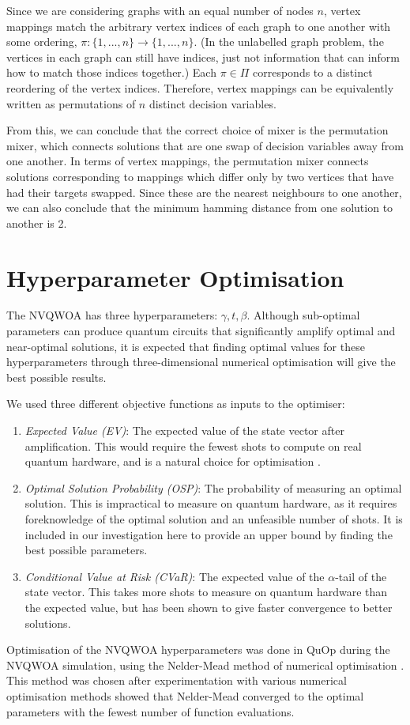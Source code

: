 Since we are considering graphs with an equal number of nodes $n$, vertex mappings match the arbitrary vertex indices of each graph to one another with some ordering, $\pi:\{1,...,n\}\to\{1,...,n\}$. (In the unlabelled graph problem, the vertices in each graph can still have indices, just not information that can inform how to match those indices together.) Each $\pi\in\Pi$ corresponds to a distinct reordering of the vertex indices. Therefore, vertex mappings can be equivalently written as permutations of $n$ distinct decision variables.

From this, we can conclude that the correct choice of mixer is the permutation mixer, which connects solutions that are one swap of decision variables away from one another. In terms of vertex mappings, the permutation mixer connects solutions corresponding to mappings which differ only by two vertices that have had their targets swapped. Since these are the nearest neighbours to one another, we can also conclude that the minimum hamming distance from one solution to another is 2.

\section{Hyperparameter Optimisation} \label{sec:parameters}
The NVQWOA has three hyperparameters: $\gamma, t, \beta$. Although sub-optimal parameters can produce quantum circuits that significantly amplify optimal and near-optimal solutions, it is expected that finding optimal values for these hyperparameters through three-dimensional numerical optimisation will give the best possible results.\cite{bennett2024analysisnonvariationalquantumwalkbased}
 
We used three different objective functions as inputs to the optimiser:
\begin{enumerate}
    \item \textit{Expected Value (EV)}: The expected value of the state vector after amplification. This would require the fewest shots to compute on real quantum hardware, and is a natural choice for optimisation \cite{cvar_opt}.
    \item \textit{Optimal Solution Probability (OSP)}: The probability of measuring an optimal solution. This is impractical to measure on quantum hardware, as it requires foreknowledge of the optimal solution and an unfeasible number of shots. It is included in our investigation here to provide an upper bound by finding the best possible parameters.
    \item \textit{Conditional Value at Risk (CVaR)}: The expected value of the $\alpha$-tail of the state vector. This takes more shots to measure on quantum hardware than the expected value, but has been shown to give faster convergence to better solutions\cite{CVaR_quantum}.
\end{enumerate}
Optimisation of the NVQWOA hyperparameters was done in QuOp during the NVQWOA simulation, using the Nelder-Mead method of numerical optimisation \cite{nelder_mead}. This method was chosen after experimentation with various numerical optimisation methods showed that Nelder-Mead converged to the optimal parameters with the fewest number of function evaluations.

